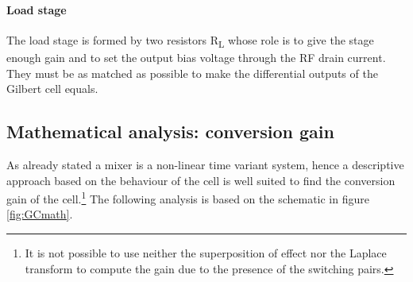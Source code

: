 \paragraph{Load stage} 
The load stage is formed by two resistors R\textsubscript{L} whose role is to give the stage enough gain and to set the output bias voltage through the RF drain current. They must be as matched as possible to make the differential outputs of the Gilbert cell equals.

\subsection{Mathematical analysis: conversion gain}

As already stated a mixer is a non-linear time variant system, hence a descriptive approach based on the behaviour of the cell is well suited to find the conversion gain of the cell.\footnote{It is not possible to use neither the superposition of effect nor the Laplace transform to compute the gain due to the presence of the switching pairs.} 
The following analysis is based on the schematic in figure \ref{fig:GCmath}.

